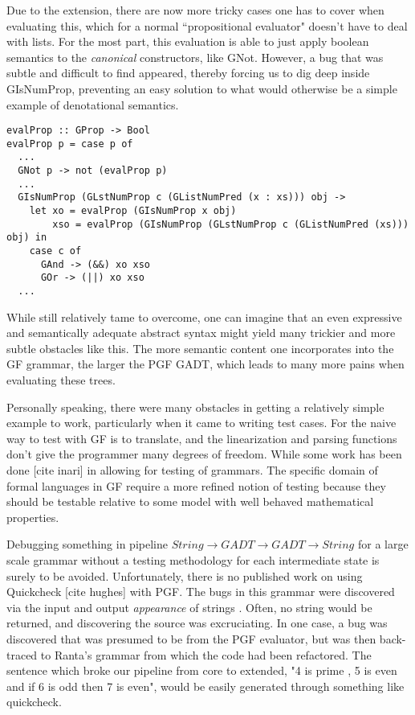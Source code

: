 Due to the extension, there are now more tricky cases one has to cover when
evaluating this, which for a normal ``propositional evaluator" doesn't have to
deal with lists. For the most part, this evaluation is able to just apply
boolean semantics to the \emph{canonical} constructors, like GNot. However, a
bug that was subtle and difficult to find appeared, thereby forcing us to dig
deep inside GIsNumProp, preventing an easy solution to what would otherwise be a
simple example of denotational semantics.
\begin{verbatim}
evalProp :: GProp -> Bool
evalProp p = case p of
  ...
  GNot p -> not (evalProp p)
  ...
  GIsNumProp (GLstNumProp c (GListNumPred (x : xs))) obj ->
    let xo = evalProp (GIsNumProp x obj)
        xso = evalProp (GIsNumProp (GLstNumProp c (GListNumPred (xs))) obj) in
    case c of
      GAnd -> (&&) xo xso 
      GOr -> (||) xo xso
  ... 
\end{verbatim}
While still relatively tame to overcome, one can imagine that an even expressive and semantically
adequate abstract syntax might yield many trickier and more subtle obstacles like this.
The more semantic content one incorporates into the GF grammar, the larger the
PGF GADT, which leads to many more pains when evaluating these trees.


Personally speaking, there were many obstacles in getting a relatively simple
example to work, particularly when it came to writing test cases. For the naive
way to test with GF is to translate, and the linearization and parsing functions
don't give the programmer many degrees of freedom. While some work has been
done [cite inari] in allowing for testing of grammars. The specific domain of
formal languages in GF require a more refined notion of testing because
they should be testable relative to some model with well behaved mathematical
properties.



Debugging something in pipeline $String \rightarrow GADT \rightarrow GADT
\rightarrow String$ for a large scale grammar without a testing methodology for
each intermediate state is surely to be avoided. Unfortunately, there is no
published work on using Quickcheck [cite hughes] with PGF. The bugs in this
grammar were discovered via the input and output \emph{appearance} of strings .
Often, no string would be returned, and discovering the source was excruciating.
In one case, a bug was discovered that was presumed to be from the PGF
evaluator, but was then back-traced to Ranta's grammar from which the code had
been refactored. The sentence which broke our pipeline from core to extended, "4
is prime , 5 is even and if 6 is odd then 7 is even", would be easily
generated through something like quickcheck.  

